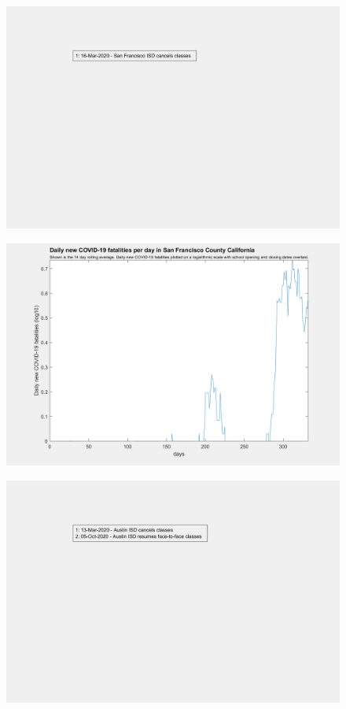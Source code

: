 \documentclass[]{article}
\begin{document}
\begin{figure}[!h]
	\includegraphics[width=\linewidth]{legends/san_francisco_school_legend.png}
	\caption{}
	\label{fig:legends/san_francisco_school_legendLabel}
\end{figure}

\begin{figure}[!h]
	\includegraphics[width=\linewidth]{images/san_francisco_fatalities_school_log.png}
	\caption{}
	\label{fig:images/san_francisco_fatalities_school_logLabel}
\end{figure}

\begin{figure}[!h]
	\includegraphics[width=\linewidth]{legends/travis_school_legend.png}
	\caption{}
	\label{fig:legends/travis_school_legendLabel}
\end{figure}
\end{document}
